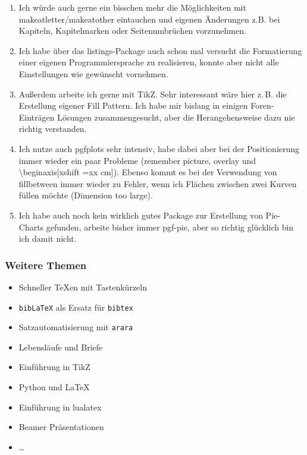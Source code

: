 \documentclass[ngerman]{beamer}
\newcommand{\bb}{\textasteriskcentered\textasteriskcentered\xspace}
\newcommand{\cc}{\textasteriskcentered\textasteriskcentered\textasteriskcentered\xspace}
\begin{document}
\begin{frame}[allowframebreaks]
\begin{enumerate}
\item Ich würde auch gerne ein bisschen mehr die Möglichkeiten mit makeatletter/makeatother eintauchen und eigenen Änderungen z.B. bei Kapiteln, Kapitelmarken oder Seitenumbrüchen vorzunehmen. \bb

\item Ich habe über das listings-Package auch schon mal versucht die Formatierung einer eigenen Programmiersprache zu realisieren, konnte aber nicht alle Einstellungen wie gewünscht vornehmen. \bb

\item 
Außerdem arbeite ich gerne mit TikZ. Sehr interessant wäre hier z.\,B. die Erstellung eigener Fill Pattern. Ich habe mir bislang in einigen Foren-Einträgen Lösungen zusammengesucht, aber die Herangehensweise dazu nie richtig verstanden. \cc

\item Ich nutze auch pgfplots sehr intensiv, habe dabei aber bei der Positionierung immer wieder ein paar Probleme (remember picture, overlay und \textbackslash  begin{axis}[xshift =xx cm]).
Ebenso kommt es bei der Verwendung von fillbetween immer wieder zu Fehler, wenn ich Flächen zwischen zwei Kurven füllen möchte (Dimension too large). \cc

\item 
Ich habe auch noch kein wirklich gutes Package zur Erstellung von Pie-Charts gefunden, arbeite bisher immer pgf-pie, aber so richtig glücklich bin ich damit nicht. \bb

\end{enumerate}
\end{frame}

\begin{frame}
\frametitle{Weitere Themen}

\begin{itemize}
\item Schneller TeXen mit Tastenkürzeln \checkmark
\item \texttt{bibLaTeX} als Ersatz für \texttt{bibtex}
\item Satzautomatisierung mit \texttt{arara} \checkmark
\item Lebensläufe und Briefe
\item Einführung in TikZ
\item Python und LaTeX
\item Einführung in lualatex
\item Beamer Präsentationen
\item \ldots
\end{itemize}
\end{frame}
\end{document}
